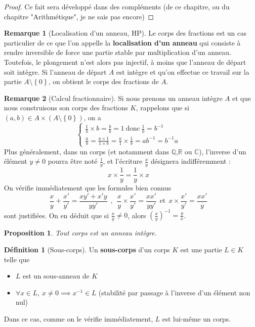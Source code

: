 \documentclass[french]{book}
\newcommand{\Q}{\mathbb{Q}}
\newcommand{\R}{\mathbb{R}}
\newcommand{\C}{\mathbb{C}}
\newcommand{\inv}{^{-1}}
\theoremstyle{plain}
\newtheorem{prop}{Proposition}[chapter]
\theoremstyle{definition}
\newtheorem{dfn}{Définition}[chapter]
\newtheorem{rmq}{Remarque}[chapter]
\theoremstyle{remark}
\begin{document}
\begin{proof}
	Ce fait sera développé dans des compléments (de ce chapitre, ou du chapitre "Arithmétique", je ne sais pas encore)
\end{proof}
\begin{rmq}[Localisation d'un anneau, HP]
	Le corps des fractions est un cas particulier de ce que l'on appelle la \textbf{localisation d'un anneau} qui consiste à rendre inversible de force une partie stable par multiplication d'un anneau. Toutefois, le plongement n'est alors pas injectif, à moins que l'anneau de départ soit intègre. Si l'anneau de départ $A$ est intègre et qu'on effectue ce travail sur la partie $A\setminus\left\{0\right\}$, on obtient le corps des fractions de $A$.
\end{rmq}
\begin{rmq}[Calcul fractionnaire]
	Si nous prenons un anneau intègre $A$ et que nous construisons son corps des fractions $K$, rappelons que si $(a,b)\in A\times (A\setminus\left\{0\right\})$, on a $$\left \{\begin{array}{ll}\displaystyle\frac{1}{b}\times b=\frac{b}{b}=1 \ \text{donc} \ \frac{1}{b}=b\inv \\[3mm] \displaystyle\frac{a}{b}=\frac{a\times 1}{1\times b}=\frac{a}{1}\times\frac{1}{b}=ab\inv=b\inv a\end{array}\right.$$ Plus généralement, dans un corps (et notamment dans $\Q$,$\R$ ou $\C$), l'inverse d'un élément $y\ne0$ pourra être noté $\displaystyle\frac{1}{y}$, et l'écriture $\displaystyle\frac{x}{y}$ désignera indifféremment : $$x\times\frac{1}{y}=\frac{1}{y}\times x$$ On vérifie immédiatement que les formules bien connus $$\frac{x}{y}+\frac{x'}{y'}=\frac{xy'+x'y}{yy'} \ \ , \ \ \frac{x}{y}\times\frac{x'}{y'}=\frac{xx'}{yy'} \ \ \text{et} \ \ x\times\frac{x'}{y'}=\frac{xx'}{y}$$ sont justifiées. On en déduit que si $\displaystyle\frac{x}{y}\ne0$, alors $\displaystyle \left(\frac{x}{y}\right)\inv=\frac{y}{x}$.
\end{rmq}
\begin{prop}
	Tout corps est un anneau intègre.
\end{prop}
\begin{dfn}[Sous-corps]
	Un \textbf{sous-corps} d'un corps $K$ est une partie $L\in K$ telle que
	\begin{itemize}
		\item $L$ est un sous-anneau de $K$
		\item $\forall x\in L,\ x\ne0\implies x\inv\in L$ (stabilité par passage à l'inverse d'un élément non nul)
	\end{itemize}
	Dans ce cas, comme on le vérifie immédiatement, $L$ est lui-même un corps.
\end{dfn}
\end{document}
